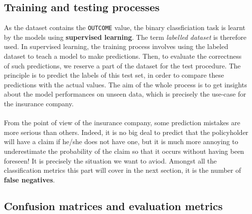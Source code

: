 \documentclass[a4paper,11pt, titlepage]{article}
\begin{document}
\subsection{Training and testing processes}

As the dataset contains the {\tt OUTCOME} value, the binary classficiation task is learnt by the models using \textbf{supervised learning}. The term \textsl{labelled dataset} is therefore used. In supervised learning, the training process involves using the labeled dataset to teach a model to make predictions. Then, to evaluate the correctness of such predictions, we reserve a part of the dataset for the test procedure. The principle is to predict the labels of this test set, in order to compare these predictions with the actual values. The aim of the whole process is to get insights about the model performances on unseen data, which is precisely the use-case for the insurance company.\\
\\
\noindent From the point of view of the insurance company, some prediction mistakes are more serious than others. Indeed, it is no big deal to predict that the policyholder will have a claim if he/she does not have one, but it is much more annoying to underestimate the probability of the claim so that it occurs without having been foreseen! It is precisely the situation we want to aviod. Amongst all the classification metrics this part will cover in the next section, it is the number of \textbf{false negatives}.

\subsection{Confusion matrices and evaluation metrics}
\end{document}
